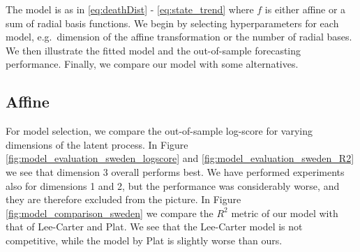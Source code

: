 \documentclass[preprint,12pt]{elsarticle}
\begin{document}
The model is as in \eqref{eq:deathDist} - \eqref{eq:state_trend} where $f$ is either affine or a sum of radial basis functions. We begin by selecting hyperparameters for each model, e.g.\ dimension of the affine transformation or the number of radial bases. We then illustrate the fitted model and the out-of-sample forecasting performance. Finally, we compare our model with some alternatives.

\subsection{Affine}\label{seq:results_sweden}

For model selection, we compare the out-of-sample log-score for varying dimensions of the latent process. In Figure \ref{fig:model_evaluation_sweden_logscore} and \ref{fig:model_evaluation_sweden_R2} we see that dimension 3 overall performs best. We have performed experiments also for dimensions 1 and 2, but the performance was considerably worse, and they are therefore excluded from the picture. In Figure \ref{fig:model_comparison_sweden} we compare the $R^2$ metric of our model with that of Lee-Carter and Plat. We see that the Lee-Carter model is not competitive, while the model by Plat is slightly worse than ours.
\end{document}
